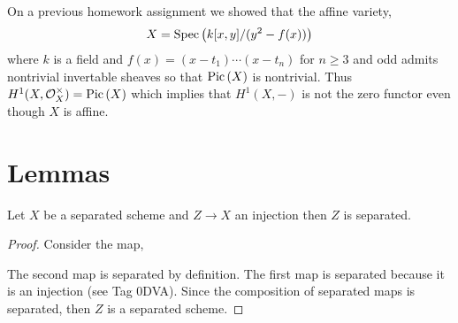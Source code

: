 \documentclass[12pt]{article}
\begin{document}
On a previous homework assignment we showed that the affine variety,
\[ X   = \mathrm{Spec}\left( k[x,y] / (y^2 - f(x)) \right) \]
where $k$ is a field and $f(x) = (x - t_1) \cdots (x - t_n)$ for $n \ge 3$ and odd admits nontrivial invertable sheaves so that $\mathrm{Pic} \left( X \right)$ is nontrivial. Thus $H^1(X, \mathcal{O}_{X}^\times) = \mathrm{Pic} \left( X \right)$ which implies that $H^1(X, -)$ is not the zero functor even though $X$ is affine. 

\newpage

\section{Lemmas}


\begin{lemma} \label{subset_separated}
Let $X$ be a separated scheme and $Z \to X$ an injection then $Z$ is separated.
\end{lemma}

\begin{proof}
Consider the map,
\begin{center}
\end{center}
The second map is separated by definition. The first map is separated because it is an injection (see Tag 0DVA). Since the composition of separated maps is separated, then $Z$ is a separated scheme. 
\end{proof}
\end{document}
